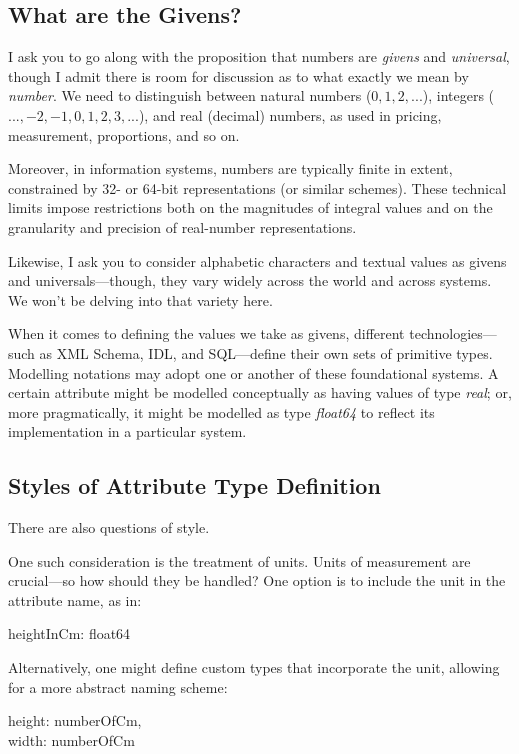 \subsection{What are the Givens?}

I ask you to go along with the proposition that numbers are \textit{givens} and \textit{universal}, though I admit there is room for discussion as to what exactly we mean by \textit{number}. We need to distinguish between natural numbers ($0,1,2,...$), integers ($...,-2,-1,0,1,2,3,...$), and real (decimal) numbers, as used in pricing, measurement, proportions, and so on. 

Moreover, in information systems, numbers are typically finite in extent, constrained by 32- or 64-bit representations (or similar schemes). These technical limits impose restrictions both on the magnitudes of integral values and on the granularity and precision of real-number representations.

Likewise, I ask you to consider alphabetic characters and textual values as givens and universals—though,  they vary widely across the world and across systems. We won’t be delving into that variety here.

When it comes to defining the values we take as givens, different technologies—such as XML Schema, IDL, and SQL—define their own sets of primitive types. Modelling notations may adopt one or another of these foundational systems. A certain attribute might be modelled conceptually as having values of type \textit{real}; or, more pragmatically, it might be modelled as type \textit{float64} to reflect its implementation in a particular system.


\subsection{Styles of Attribute Type Definition}

There are also questions of style.

One such consideration is the treatment of units. Units of measurement are crucial—so how should they be handled? One option is to include the unit in the attribute name, as in:

\begin{erquote}
heightInCm: float64
\end{erquote}

Alternatively, one might define custom types that incorporate the unit, allowing for a more abstract naming scheme:

\begin{erquote}
height: numberOfCm,\\
width: numberOfCm
\end{erquote}


